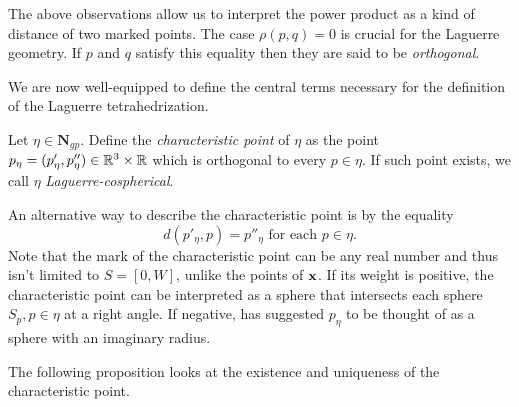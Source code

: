 The above observations allow us to interpret the power product as a kind of distance of two marked points. The case $\rho(p,q)=0$ is crucial for the Laguerre geometry. If $p$ and $q$ satisfy this equality then they are said to be \textit{orthogonal}. 

We are now well-equipped to define the central terms necessary for the definition of the Laguerre tetrahedrization.

\begin{definition}
	Let $\eta\in \mathbf N_{gp}$. Define the \textit{characteristic point} of $\eta$ as the point $p_{\eta} = (p'_\eta, p''_\eta) \in {\mathbb R^3} \times \mathbb R$ which is orthogonal to every $p\in \eta$. If such point exists, we call $\eta$ \textit{Laguerre-cospherical}. 
\end{definition}
An alternative way to describe the characteristic point is by the equality 
\begin{equation}\label{eq:charpoint}
	d(p'_\eta,p)=p''_\eta \text{ for each } p \in \eta.
\end{equation}
Note that the mark of the characteristic point can be any real number and thus isn't limited to $S=[0,W]$, unlike the points of ${\mathbf{x}}$.
If its weight is positive, the characteristic point can be interpreted as a sphere that intersects each sphere $S_p, p\in\eta$ at a right angle. If negative, \cite{Edelsbrunner1996} has suggested $p_\eta$ to be thought of as a sphere with an imaginary radius. \newline

The following proposition looks at the existence and uniqueness of the characteristic point.

